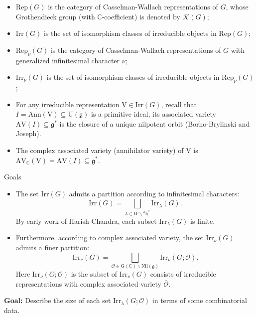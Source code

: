 \documentclass[fleqn,xcolor=dvipsnames]{beamer}
\newcommand{\BC}{{\mathbb {C}}}
\newcommand{\CK}{{\mathcal {K}}}
\newcommand{\CO}{{\mathcal {O}}}
\newcommand{\RG}{{\mathrm {G}}}
\newcommand{\RV}{{\mathrm {V}}}
\newcommand{\fg}{\mathfrak{g}}
\newcommand{\U}{{\mathrm{U}}}
\newcommand{\Irr}{{\mathrm{Irr}}}
\newcommand{\Rep}{{\mathrm{Rep}}}
\newcommand{\Nil}{{\mathrm{Nil}}}
\renewcommand{\bar}{\overline}
\begin{document}
\begin{frame}
  \begin{itemize}
    \item $\mathrm{Rep}(G)$ is the category of Casselman-Wallach representations of $G$, whose Grothendieck group (with $\BC$-coefficient) is denoted by $\CK(G)$;
    \pause\item $\mathrm{Irr}(G)$ is the set of isomorphism classes of irreducible objects in $\mathrm{Rep}(G)$;
    \pause\item $\Rep_{\nu}(G)$ is the category of Casselman-Wallach representations of $G$ with generalized infinitesimal character $\nu$;
    \pause\item $\Irr_{\nu}(G)$ is the set of isomorphism classes of irreducible objects in $\mathrm{Rep}_{\nu}(G)$;
    \pause\item For any irreducible representation $\RV \in \Irr(G)$, recall that $I = \mathrm{Ann}(\RV) \subseteq \U(\fg)$ is a primitive ideal, its associated variety $\mathrm{AV}(I) \subseteq \fg^*$ is the closure of a unique nilpotent orbit (Borho-Brylinski and Joseph).
    \pause\item The complex associated variety (annihilator variety) of $\RV$ is $\mathrm{AV}_{\BC}(\RV) = \mathrm{AV}(I) \subseteq \fg^*$. 
  \end{itemize}
\end{frame}




\begin{frame}{Goals}
  \begin{itemize}
  \item The set \(\Irr(G)\) admits a partition according to infinitesimal characters:
  \[
    \Irr(G) = \bigsqcup\limits_{\lambda \in W \backslash {^{a}\mathfrak{h}}^*} \Irr_{\lambda}(G).
  \]
  By early work of Harish-Chandra, each subset \(\Irr_{\lambda}(G)\) is finite.
  
  \pause\item Furthermore, according to complex associated variety, the set \(\Irr_{\nu}(G)\) admits a finer partition:
  \[
    \Irr_{\nu}(G) = \bigsqcup\limits_{\mathcal{O} \in \RG(\mathbb{C}) \backslash \Nil(\mathfrak{g})} \Irr_{\nu}(G; \mathcal{O}).
  \]
  Here $\Irr_{\nu}(G;\CO)$ is the subset of $\Irr_{\nu}(G)$ consists of irreducible representations with complex associated variety $\bar{\CO}$.
\end{itemize}

\medskip

\noindent
\pause\textbf{Goal:} Describe the size of each set \(\Irr_{\lambda}(G; \mathcal{O})\) in terms of some combinatorial data.
\end{frame}
\end{document}
